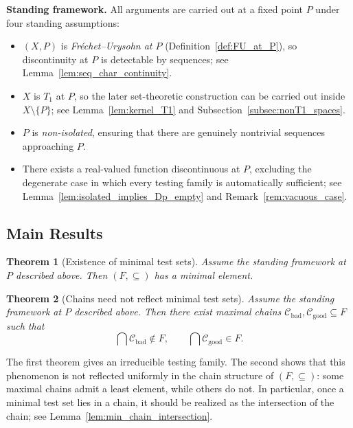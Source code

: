 \documentclass[11pt]{amsart}
\theoremstyle{plain}
\newtheorem{theorem}{Theorem}[section]
\theoremstyle{definition}
\theoremstyle{remark}
\newcommand{\F}{\mathcal{F}}
\def\F{F}%
\begin{document}
\medskip
\noindent\textbf{Standing framework.}
All arguments are carried out at a fixed point $P$ under four standing assumptions:
\begin{itemize}[leftmargin=2.2em,itemsep=0.6em]
\item $(X,P)$ is \emph{Fr\'echet--Urysohn at $P$} (Definition~\ref{def:FU_at_P}), so discontinuity at $P$ is detectable by sequences; see Lemma~\ref{lem:seq_char_continuity}.

\item $X$ is $T_1$ at $P$, so the later set-theoretic construction can be carried out inside $X\setminus\{P\}$; see Lemma~\ref{lem:kernel_T1} and Subsection~\ref{subsec:nonT1_spaces}.

\item $P$ is \emph{non-isolated}, ensuring that there are genuinely nontrivial sequences approaching $P$.

\item There exists a real-valued function discontinuous at $P$, excluding the degenerate case in which every testing family is automatically sufficient; see Lemma~\ref{lem:isolated_implies_Dp_empty} and Remark~\ref{rem:vacuous_case}.
\end{itemize}

\subsection*{Main Results}

\begin{theorem}[Existence of minimal test sets]\label{thm:minimal_exists_intro}
Assume the standing framework at $P$ described above.
Then $(\F,\subseteq)$ has a minimal element.
\end{theorem}

\begin{theorem}[Chains need not reflect minimal test sets]\label{thm:chains_exist_intro}
Assume the standing framework at $P$ described above.
Then there exist maximal chains $\mathcal{C}_{\mathrm{bad}},\mathcal{C}_{\mathrm{good}}\subseteq\F$ such that
\[
\bigcap \mathcal{C}_{\mathrm{bad}} \notin \F,
\qquad
\bigcap \mathcal{C}_{\mathrm{good}} \in \F.
\]
\end{theorem}

The first theorem gives an irreducible testing family.
The second shows that this phenomenon is not reflected uniformly in the chain structure of $(\F,\subseteq)$:
some maximal chains admit a least element, while others do not.
In particular, once a minimal test set lies in a chain, it should be realized as the intersection of the chain; see Lemma~\ref{lem:min_chain_intersection}.
\end{document}
